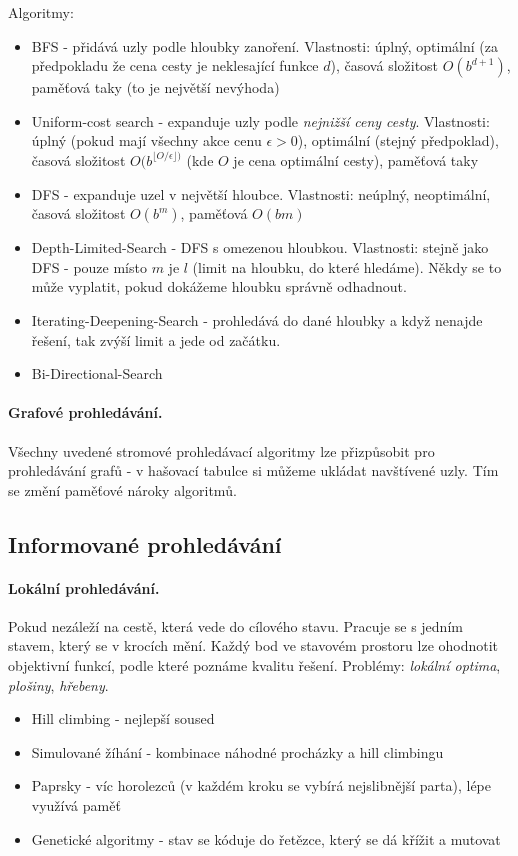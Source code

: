 \documentclass[a4paper]{article}      %
\begin{document}
Algoritmy:
\begin{itemize}
\item BFS - přidává uzly podle hloubky zanoření. Vlastnosti: úplný, optimální (za předpokladu že cena cesty je neklesající funkce $d$), časová složitost $O(b^{d+1})$, paměťová taky (to je největší nevýhoda)
\item Uniform-cost search - expanduje uzly podle \emph{nejnižší ceny cesty}.
Vlastnosti: úplný (pokud mají všechny akce cenu $\epsilon > 0$), optimální (stejný předpoklad), časová složitost $O(b^{\lfloor O/\epsilon \rfloor)}$ (kde $O$ je cena optimální cesty), paměťová taky
\item DFS - expanduje uzel v největší hloubce. Vlastnosti: neúplný, neoptimální, časová složitost $O(b^{m})$, paměťová $O(bm)$
\item Depth-Limited-Search - DFS s omezenou hloubkou. Vlastnosti: stejně jako DFS - pouze místo $m$ je $l$
(limit na hloubku, do které hledáme). Někdy se to může vyplatit, pokud dokážeme hloubku správně odhadnout.
\item Iterating-Deepening-Search - prohledává do dané hloubky a když nenajde řešení, tak zvýší limit a jede od začátku.
\item Bi-Directional-Search
\end{itemize}

\paragraph{Grafové prohledávání.} Všechny uvedené stromové prohledávací algoritmy lze přizpůsobit pro prohledávání grafů -
v hašovací tabulce si můžeme ukládat navštívené uzly. Tím se změní paměťové nároky algoritmů.

\subsection{Informované prohledávání}

\paragraph{Lokální prohledávání.}
Pokud nezáleží na cestě, která vede do cílového stavu. Pracuje se s jedním stavem, který se v krocích mění. Každý bod ve stavovém prostoru lze ohodnotit objektivní funkcí, podle které poznáme kvalitu řešení. Problémy: \emph{lokální optima}, \emph{plošiny}, \emph{hřebeny}.
\begin{itemize}
\item Hill climbing - nejlepší soused
\item Simulované žíhání - kombinace náhodné procházky a hill climbingu
\item Paprsky - víc horolezců (v každém kroku se vybírá nejslibnější parta), lépe využívá paměť
\item Genetické algoritmy - stav se kóduje do řetězce, který se dá křížit a mutovat
\end{itemize}
\end{document}
